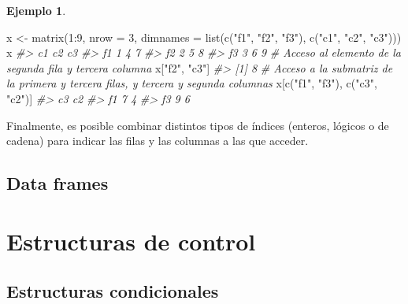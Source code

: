 \documentclass[
]{book}
\newenvironment{Shaded}{\begin{snugshade}}{\end{snugshade}}
\newcommand{\AttributeTok}[1]{\textcolor[rgb]{0.77,0.63,0.00}{#1}}
\newcommand{\CommentTok}[1]{\textcolor[rgb]{0.56,0.35,0.01}{\textit{#1}}}
\newcommand{\DecValTok}[1]{\textcolor[rgb]{0.00,0.00,0.81}{#1}}
\newcommand{\FunctionTok}[1]{\textcolor[rgb]{0.00,0.00,0.00}{#1}}
\newcommand{\NormalTok}[1]{#1}
\newcommand{\OtherTok}[1]{\textcolor[rgb]{0.56,0.35,0.01}{#1}}
\newcommand{\SpecialCharTok}[1]{\textcolor[rgb]{0.00,0.00,0.00}{#1}}
\newcommand{\StringTok}[1]{\textcolor[rgb]{0.31,0.60,0.02}{#1}}
\theoremstyle{definition}
\theoremstyle{definition}
\newtheorem{example}{Ejemplo}[chapter]
\theoremstyle{definition}
\theoremstyle{definition}
\theoremstyle{remark}
\begin{document}
\begin{example}
\begin{Shaded}
\begin{Highlighting}[]
\NormalTok{x }\OtherTok{\textless{}{-}} \FunctionTok{matrix}\NormalTok{(}\DecValTok{1}\SpecialCharTok{:}\DecValTok{9}\NormalTok{, }\AttributeTok{nrow =} \DecValTok{3}\NormalTok{, }\AttributeTok{dimnames =} \FunctionTok{list}\NormalTok{(}\FunctionTok{c}\NormalTok{(}\StringTok{"f1"}\NormalTok{, }\StringTok{"f2"}\NormalTok{, }\StringTok{"f3"}\NormalTok{), }\FunctionTok{c}\NormalTok{(}\StringTok{"c1"}\NormalTok{, }\StringTok{"c2"}\NormalTok{, }\StringTok{"c3"}\NormalTok{)))}
\NormalTok{x}
\CommentTok{\#\textgreater{}    c1 c2 c3}
\CommentTok{\#\textgreater{} f1  1  4  7}
\CommentTok{\#\textgreater{} f2  2  5  8}
\CommentTok{\#\textgreater{} f3  3  6  9}
\CommentTok{\# Acceso al elemento de la segunda fila y tercera columna}
\NormalTok{x[}\StringTok{"f2"}\NormalTok{, }\StringTok{"c3"}\NormalTok{]}
\CommentTok{\#\textgreater{} [1] 8}
\CommentTok{\# Acceso a la submatriz de la primera y tercera filas, y tercera y segunda columnas}
\NormalTok{x[}\FunctionTok{c}\NormalTok{(}\StringTok{"f1"}\NormalTok{, }\StringTok{"f3"}\NormalTok{), }\FunctionTok{c}\NormalTok{(}\StringTok{"c3"}\NormalTok{, }\StringTok{"c2"}\NormalTok{)]}
\CommentTok{\#\textgreater{}    c3 c2}
\CommentTok{\#\textgreater{} f1  7  4}
\CommentTok{\#\textgreater{} f3  9  6}
\end{Highlighting}
\end{Shaded}

\end{example}

Finalmente, es posible combinar distintos tipos de índices (enteros, lógicos o de cadena) para indicar las filas y las columnas a las que acceder.

\hypertarget{data-frames}{%
\section{Data frames}\label{data-frames}}

\hypertarget{estructuras-de-control}{%
\chapter{Estructuras de control}\label{estructuras-de-control}}

\hypertarget{estructuras-condicionales}{%
\section{Estructuras condicionales}\label{estructuras-condicionales}}
\end{document}
